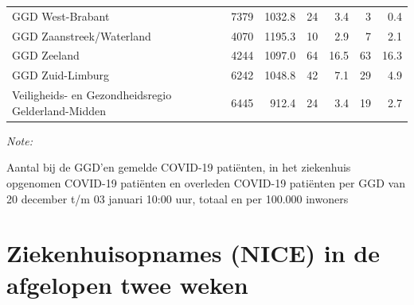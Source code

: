 \documentclass[
  english,
  man,floatsintext]{apa6}
\begin{document}
\begin{table}
\begin{threeparttable}
\begin{tabular}{lrrrrrr}
GGD West-Brabant & 7379 & 1032.8 & 24 & 3.4 & 3 & 0.4\\
GGD Zaanstreek/Waterland & 4070 & 1195.3 & 10 & 2.9 & 7 & 2.1\\
GGD Zeeland & 4244 & 1097.0 & 64 & 16.5 & 63 & 16.3\\
GGD Zuid-Limburg & 6242 & 1048.8 & 42 & 7.1 & 29 & 4.9\\
Veiligheids- en Gezondheidsregio Gelderland-Midden & 6445 & 912.4 & 24 & 3.4 & 19 & 2.7\\
\bottomrule
\end{tabular}
\begin{tablenotes}
\item \textit{Note: } 
\item Aantal bij de GGD’en gemelde COVID-19 patiënten, in het ziekenhuis opgenomen COVID-19 patiënten en overleden COVID-19 patiënten per GGD van 20 december t/m 03 januari 10:00 uur, totaal en per 100.000 inwoners
\end{tablenotes}
\end{threeparttable}
\endgroup{}
\end{table}

\newpage

\hypertarget{ziekenhuisopnames-nice-in-de-afgelopen-twee-weken}{%
\section{Ziekenhuisopnames (NICE) in de afgelopen twee weken}\label{ziekenhuisopnames-nice-in-de-afgelopen-twee-weken}}
\end{document}
